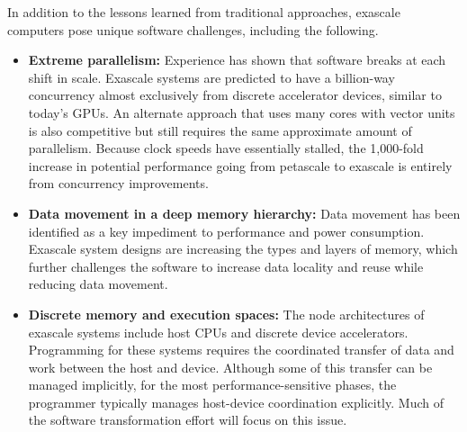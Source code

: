 In addition to the lessons learned from traditional approaches, exascale computers pose unique software challenges, including the following.
\begin{itemize}
\item \textbf{Extreme parallelism:} Experience has shown that software breaks at each shift in scale. Exascale systems are predicted to have a billion-way concurrency almost exclusively from discrete accelerator devices, similar to today's GPUs. An alternate approach that uses many cores with vector units is also competitive but still requires the same approximate amount of parallelism.  Because clock speeds have essentially stalled, the 1,000-fold increase in potential performance going from petascale to exascale is entirely from concurrency improvements.
\item \textbf{Data movement in a deep memory hierarchy: }Data movement has been identified as a key impediment to performance and power consumption. Exascale system designs are increasing the types and layers of memory, which further challenges the software to increase data locality and reuse while reducing data movement.
\item \textbf{Discrete memory and execution spaces:} The node architectures of exascale systems include host CPUs and discrete device accelerators.  Programming for these systems requires the coordinated transfer of data and work between the host and device. Although some of this transfer can be managed implicitly, for the most performance-sensitive phases, the programmer typically manages host-device coordination explicitly.  Much of the software transformation effort will focus on this issue.
\end{itemize}
 
